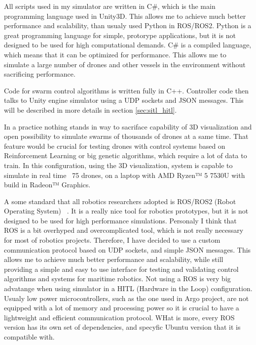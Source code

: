 All scripts used in my simulator are written in C\#, which is the main programming language used in Unity3D. This allows me to achieve much better performance and scalability, than usualy used Python in ROS/ROS2. Python is a great programming language for simple, protorype applications, but it is not designed to be used for high computational demands. C\# is a compiled language, which means that it can be optimized for performance. This allows me to simulate a large number of drones and other vessels in the environment without sacrificing performance.

Code for swarm control algorithms is written fully in C++. Controller code then talks to Unity engine simulator using a UDP sockets and JSON messages. This will be described in more details in section \ref{sec:sitl_hitl}.

In a practice nothing stands in way to sacriface capability of 3D visualization and open possibility to simulate swarms of thousands of drones at a same time. That feature would be crucial for testing drones with control systems based on Reinforcement Learning or big genetic algorithms, which require a lot of data to train. In this configuration, using the 3D visualization, system is capable to simulate in real time ~75 drones, on a laptop with AMD Ryzen™ 5 7530U with build in Radeon™ Graphics. 

A some standard that all robotics researchers adopted is ROS/ROS2 (Robot Operating System) ~\cite{ROS}. It is a really nice tool for robotics prototypes, but it is not designed to be used for high performance simulations. Personaly I think that ROS is a bit overhyped and overcomplicated tool, which is not really necessary for most of robotics projects. Therefore, I have decided to use a custom communication protocol based on UDP sockets, and simple JSON messages. This allows me to achieve much better performance and scalability, while still providing a simple and easy to use interface for testing and validating control algorithms and systems for maritime robotics. Not using a ROS is very big advatange when using simulator in a HITL (Hardware in the Loop) configuration. Usualy low power microcontrollers, such as the one used in Argo project, are not equipped with a lot of memory and processing power so it is crucial to have a lightweight and efficient communication protocol. WHat is more, every ROS version has its own set of dependencies, and specyfic Ubuntu version that it is compatible with. 

